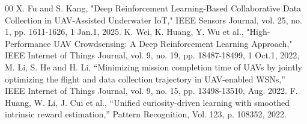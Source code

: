 \documentclass[conference]{IEEEtran}
\begin{document}
\begin{thebibliography}{00}
X. Fu and S. Kang, "Deep Reinforcement Learning-Based Collaborative Data Collection in UAV-Assisted Underwater IoT," IEEE Sensors Journal, vol. 25, no. 1, pp. 1611-1626, 1 Jan.1, 2025. 
K. Wei, K. Huang, Y. Wu et al., "High-Performance UAV Crowdsensing: A Deep Reinforcement Learning Approach," IEEE Internet of Things Journal, vol. 9, no. 19, pp. 18487-18499, 1 Oct.1, 2022, 
 M. Li, S. He and H. Li, ``Minimizing mission completion time of UAVs by jointly optimizing the flight and data collection trajectory in UAV-enabled WSNs,'' IEEE Internet of Things Journal, vol. 9, no. 15, pp. 13498-13510, Aug. 2022. 
 F. Huang, W. Li, J. Cui et al., ``Unified curiosity-driven learning with smoothed intrinsic reward estimation,'' Pattern Recognition, Vol. 123, p. 108352, 2022. 
\end{thebibliography}
\end{document}
